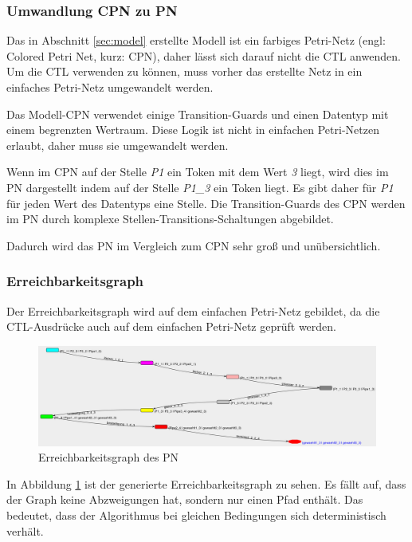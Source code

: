\subsubsection{Umwandlung CPN zu PN}
Das in Abschnitt \ref{sec:model} erstellte Modell ist ein farbiges Petri-Netz (engl: Colored Petri Net, kurz: CPN), daher lässt sich darauf nicht die CTL anwenden. Um die CTL verwenden zu können, muss vorher das erstellte Netz in ein einfaches Petri-Netz umgewandelt werden.

Das Modell-CPN verwendet einige Transition-Guards und einen Datentyp mit einem begrenzten Wertraum. Diese Logik ist nicht in einfachen Petri-Netzen erlaubt, daher muss sie umgewandelt werden.

Wenn im CPN auf der Stelle \textit{P1} ein Token mit dem Wert \textit{3} liegt, wird dies im PN dargestellt indem auf der Stelle \textit{P1\_3} ein Token liegt. Es gibt daher für \textit{P1} für jeden Wert des Datentyps eine Stelle. Die Transition-Guards des CPN werden im PN durch komplexe Stellen-Transitions-Schaltungen abgebildet.

Dadurch wird das PN im Vergleich zum CPN sehr groß und unübersichtlich.

\subsubsection{Erreichbarkeitsgraph}
Der Erreichbarkeitsgraph wird auf dem einfachen Petri-Netz gebildet, da die CTL-Ausdrücke auch auf dem einfachen Petri-Netz geprüft werden.

\begin{figure}[H]
\centering
\includegraphics[width=1\linewidth]{reachibility_graph}
\caption{Erreichbarkeitsgraph des PN}
\label{fig:reachibility_graph}
\end{figure}

In Abbildung \ref{fig:reachibility_graph} ist der generierte Erreichbarkeitsgraph zu sehen. Es fällt auf, dass der Graph keine Abzweigungen hat, sondern nur einen Pfad enthält. Das bedeutet, dass der Algorithmus bei gleichen Bedingungen sich deterministisch verhält.

